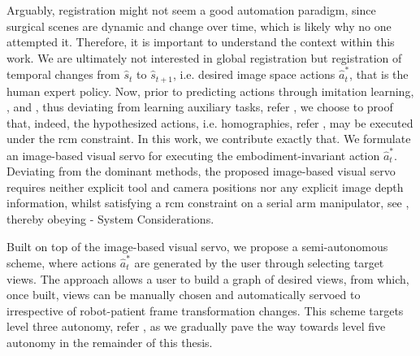 Arguably, registration might not seem a good automation paradigm, since surgical scenes are dynamic and change over time, which is likely why no one attempted it. Therefore, it is important to understand the context within this work. We are ultimately not interested in global registration but registration of temporal changes from $\hat{s}_t$ to $\hat{s}_{t+1}$, i.e. desired image space actions $\hat{a}^*_t$, that is the human expert policy. Now, prior to predicting actions through imitation learning, , and , thus deviating from learning auxiliary tasks, refer , we choose to proof that, indeed, the hypothesized actions, i.e. homographies, refer , may be executed under the \acrshort{rcm} constraint. In this work, we contribute exactly that. We formulate an image-based visual servo for executing the embodiment-invariant action $\hat{a}^*_t$. Deviating from the dominant methods, the proposed image-based visual servo requires neither explicit tool and camera positions nor any explicit image depth information, whilst satisfying a \acrshort{rcm} constraint on a serial arm manipulator, see , thereby obeying  - System Considerations.

Built on top of the image-based visual servo, we propose a semi-autonomous scheme, where actions $\hat{a}^*_t$ are generated by the user through selecting target views. The approach allows a user to build a graph of desired views, from which, once built, views can be manually chosen and automatically servoed to irrespective of robot-patient frame transformation changes. This scheme targets level three autonomy, refer , as we gradually pave the way towards level five autonomy in the remainder of this thesis.



